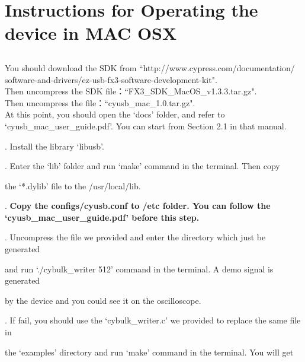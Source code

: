 \chapter{\heiti Instructions for Operating the device in MAC OSX}
\section{}

\hspace{-0.2cm}You should download the SDK from ``http://www.cypress.com/documentation/
software-and-drivers/ez-usb-fx3-software-development-kit". 
\\Then uncompress the SDK file：``FX3\_SDK\_MacOS\_v1.3.3.tar.gz".
\\Then uncompress the file：``cyusb\_mac\_1.0.tar.gz". 
\\At this point, you should open the `docs' folder, and refer to `cyusb\_mac\_user\_guide.pdf'. You can start from Section 2.1 in that manual.

. Install the library `libusb'.

. Enter the `lib' folder and run `make' command in the terminal. Then copy

\hspace{-0.15cm}the `*.dylib' file to the /usr/local/lib.

. \textbf{Copy the configs/cyusb.conf to /etc folder. You can follow the `cyusb\_mac\_user\_guide.pdf' \indent before this step.}

. Uncompress the file we provided and enter the directory which just be generated

\hspace{-0.15cm}and run `./cybulk\_writer 512' command in the terminal. A demo signal is generated

\hspace{-0.15cm}by the device and you could see it on the oscilloscope.

. If fail, you should use the `cybulk\_writer.c' we provided to replace the same file in

\hspace{-0.15cm}the  `examples' directory and run `make' command in the terminal. You will get

